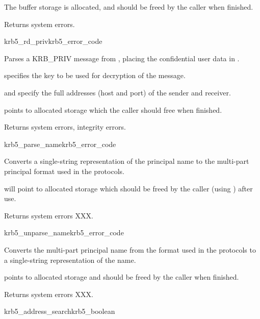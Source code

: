 The  buffer storage is allocated, and should be freed by the
caller when finished.

Returns system errors.

\begin{funcdecl}{krb5_rd_priv}{krb5_error_code}{\funcin}
\funcout
{}
\end{funcdecl}

Parses a KRB_PRIV message from , placing the confidential user
data in .

 specifies the key to be used for decryption of the message.
 
 and  specify the full
addresses (host and port) of the sender and receiver.

 points to allocated storage which the caller should
free when finished.

Returns system errors, integrity errors.

\begin{funcdecl}{krb5_parse_name}{krb5_error_code}{\funcin}
\funcout
{}
\end{funcdecl}

Converts a single-string representation  of the
principal name to the multi-part principal format used in the protocols.

 will point to allocated storage which should be freed by
the caller (using ) after use.

Returns system errors XXX.

\begin{funcdecl}{krb5_unparse_name}{krb5_error_code}{\funcin}
\funcout
{}
\end{funcdecl}

Converts the multi-part principal name  from the
format used in the protocols to a single-string representation of the name.

 points to allocated storage and should be freed by the caller
when finished.

Returns system errors XXX.

\begin{funcdecl}{krb5_address_search}{krb5_boolean}{\funcin}
\end{funcdecl}


